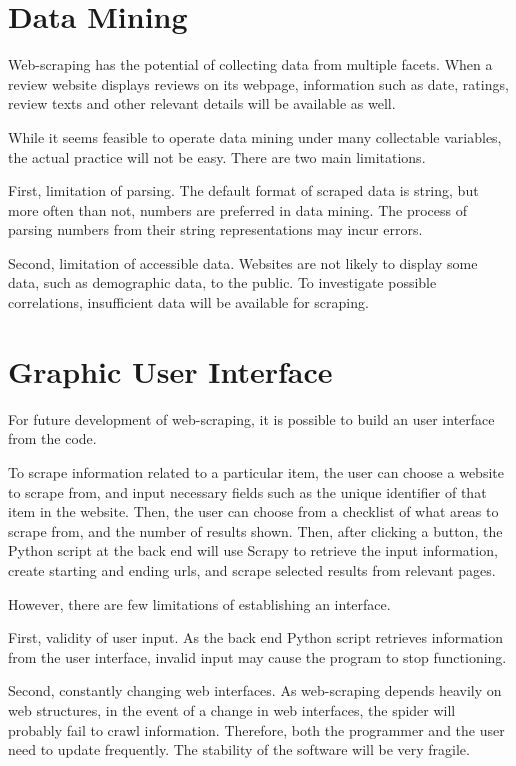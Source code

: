 \documentclass[12pt]{report}
\begin{document}
\section{Data Mining}

Web-scraping has the potential of collecting data from multiple facets. When a review website displays reviews on its webpage, information such as date, ratings, review texts and other relevant details will be available as well. 

While it seems feasible to operate data mining under many collectable variables, the actual practice will not be easy. There are two main limitations.

First, limitation of parsing. The default format of scraped data is string, but more often than not, numbers are preferred in data mining. The process of parsing numbers from their string representations may incur errors.

Second, limitation of accessible data. Websites are not likely to display some data, such as demographic data, to the public. To investigate possible correlations, insufficient data will be available for scraping.


\section{Graphic User Interface}

For future development of web-scraping, it is possible to build an user interface from the code. 

To scrape information related to a particular item, the user can choose a website to scrape from, and input necessary fields such as the unique identifier of that item in the website. Then, the user can choose from a checklist of what areas to scrape from, and the number of results shown. Then, after clicking a button, the Python script at the back end will use Scrapy to retrieve the input information, create starting and ending urls, and scrape selected results from relevant pages.

However, there are few limitations of establishing an interface.

First, validity of user input. As the back end Python script retrieves information from the user interface, invalid input may cause the program to stop functioning.

Second, constantly changing web interfaces. As web-scraping depends heavily on web structures, in the event of a change in web interfaces, the spider will probably fail to crawl information. Therefore, both the programmer and the user need to update frequently. The stability of the software will be very fragile.

\newpage
\begin{appendices}
\printglossaries
\end{appendices}
\end{document}
